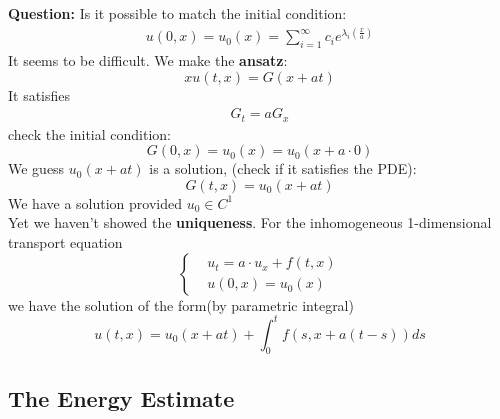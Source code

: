 \textbf{Question:} Is it possible to match the initial condition:
\begin{align*}
	u(0, x) = u_0(x) = \sum_{i = 1}^\infty c_i e^{\lambda_i(\frac{x}{a})}
\end{align*}
It seems to be difficult. We make the \textbf{ansatz}:
\begin{equation*}x
	u(t, x) = G(x + at)
\end{equation*}
It satisfies 
\begin{align*}
	G_t = a G_x
\end{align*}
check the initial condition:
\begin{equation*}
	G(0, x) = u_0(x) = u_0(x + a\cdot 0)
\end{equation*}
We guess $u_0(x + at)$ is a solution, (check if it satisfies the PDE):
\begin{equation*}
	G(t,x) = u_0(x + at)
\end{equation*}
We have a solution provided $u_0 \in C^1$
\\
Yet we haven't showed the \textbf{uniqueness}. For the inhomogeneous 1-dimensional transport equation
\begin{equation}\label{TE}
\left\{
	\begin{aligned}
		&u_t = a \cdot u_x + f(t, x)\\
		&u(0, x) = u_0(x)
	\end{aligned}
\right.
\end{equation}
we have the solution of the form(by parametric integral)
\begin{equation} \label{TE: solution}
	u(t, x) = u_0(x + at) + \int_0^t f(s, x + a(t -s))ds
\end{equation}

\subsection{The Energy Estimate}

